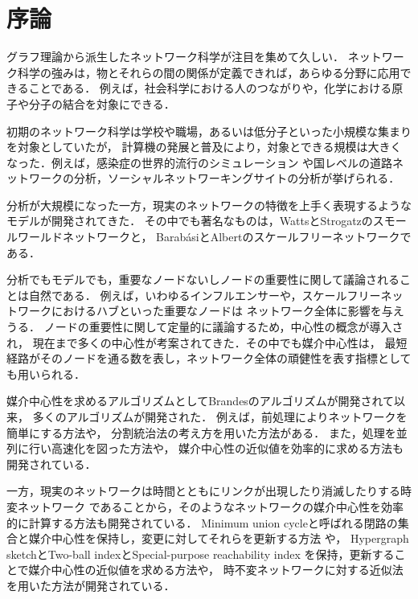 \chapter{序論}
\label{chap:introduction}

グラフ理論から派生したネットワーク科学が注目を集めて久しい．
ネットワーク科学の強みは，物とそれらの間の関係が定義できれば，あらゆる分野に応用できることである．
例えば，社会科学における人のつながりや，化学における原子や分子の結合を対象にできる．

初期のネットワーク科学は学校や職場，あるいは低分子といった小規模な集まりを対象としていたが，
計算機の発展と普及により，対象とできる規模は大きくなった．例えば，感染症の世界的流行のシミュレーション
や国レベルの道路ネットワークの分析，ソーシャルネットワーキングサイトの分析が挙げられる．

分析が大規模になった一方，現実のネットワークの特徴を上手く表現するようなモデルが開発されてきた．
その中でも著名なものは，WattsとStrogatzのスモールワールドネットワーク\cite{Watts1998}と，
Barab{\'{a}}siとAlbertのスケールフリーネットワーク\cite{Barabasi1999}である．

分析でもモデルでも，重要なノードないしノードの重要性に関して議論されることは自然である．
例えば，いわゆるインフルエンサーや，スケールフリーネットワークにおけるハブといった重要なノードは
ネットワーク全体に影響を与えうる．
ノードの重要性に関して定量的に議論するため，中心性の概念が導入され，
現在まで多くの中心性が考案されてきた．その中でも媒介中心性\cite{Freeman1977}は，
最短経路がそのノードを通る数を表し，ネットワーク全体の頑健性を表す指標としても用いられる．

媒介中心性を求めるアルゴリズムとしてBrandesのアルゴリズム\cite{Brandes2001}が開発されて以来，
多くのアルゴリズムが開発された．
例えば，前処理によりネットワークを簡単にする方法\cite{Puzis2012,Bentert2018}や，
分割統治法\cite{Erdos2015}の考え方を用いた方法がある．
また，処理を並列に行い高速化を図った方法\cite{Bader2006,Tan2009,Edmonds2010,Bernaschi2016}や，
媒介中心性の近似値を効率的に求める方法\cite{Brandes2007,Bader2007,Pfeffer2012,Yoshida2014}も
開発されている．

一方，現実のネットワークは時間とともにリンクが出現したり消滅したりする時変ネットワーク\cite{Holme2012}
であることから，そのようなネットワークの媒介中心性を効率的に計算する方法も開発されている．
Minimum union cycleと呼ばれる閉路の集合と媒介中心性を保持し，変更に対してそれらを更新する方法
\cite{Lee2012,Singh2015}や，
Hypergraph sketch\cite{Yoshida2014}とTwo-ball indexとSpecial-purpose reachability index
を保持，更新することで媒介中心性の近似値を求める方法\cite{Hayashi2015}や，
時不変ネットワークに対する近似法を用いた方法\cite{Bergamini2015a,Bergamini2015b}が開発されている．

